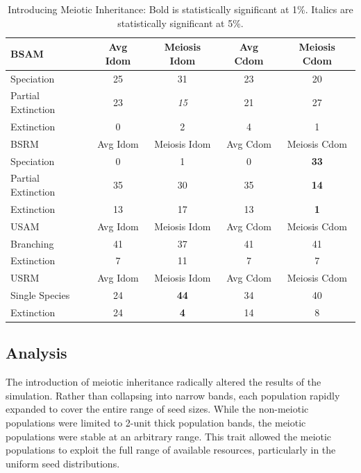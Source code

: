 \documentclass[conference]{IEEEtran}
\begin{document}
\begin{table}
\centering
    \caption{Introducing Meiotic Inheritance: Bold is statistically significant at 1\%. Italics are statistically significant at 5\%.}
    \begin{tabular}{| p{3.00cm} *{4}{|c} |}
        \hline 
        BSAM & Avg Idom & Meiosis Idom & Avg Cdom & Meiosis Cdom \\ \hline
        Speciation & 25 & 31 & 23 & 20 \\ \hline
        Partial Extinction & 23 & \textit{15} & 21 & 27 \\ \hline
        Extinction & 0 & 2 & 4 & 1 \\ \hline
        BSRM & Avg Idom & Meiosis Idom & Avg Cdom & Meiosis Cdom \\ \hline
        Speciation & 0 & 1 & 0 & \textbf{33} \\ \hline
        Partial Extinction & 35 & 30 & 35 & \textbf{14} \\ \hline
        Extinction & 13 & 17 & 13 & \textbf{1} \\ \hline
        USAM & Avg Idom & Meiosis Idom & Avg Cdom & Meiosis Cdom \\ \hline
        Branching & 41 & 37 & 41 & 41 \\ \hline
        Extinction & 7 & 11 & 7 & 7 \\ \hline
        USRM & Avg Idom & Meiosis Idom & Avg Cdom & Meiosis Cdom \\ \hline
        Single Species & 24 & \textbf{44} & 34 & 40 \\ \hline
        Extinction & 24 & \textbf{4} & 14 & 8 \\ \hline
    \end{tabular}
    \label{table:EXP3}
\end{table}

\subsection{Analysis}

The introduction of meiotic inheritance radically altered the results of the simulation. Rather than collapsing into narrow bands, each population rapidly expanded to cover the entire range of seed sizes. While the non-meiotic populations were limited to 2-unit thick population bands, the meiotic populations were stable at an arbitrary range. This trait allowed the meiotic populations to exploit the full range of available resources, particularly in the uniform seed distributions. 
\end{document}
